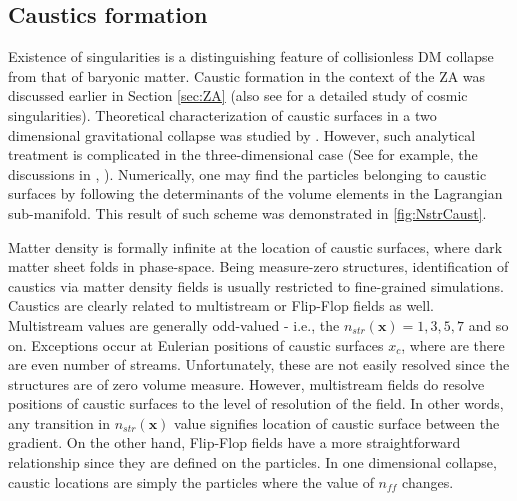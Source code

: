 



\subsection{Caustics formation}



Existence of singularities is a distinguishing feature of collisionless DM collapse from that of baryonic matter. Caustic formation in the context of the ZA \citep{Zeldovich1970} was discussed earlier in Section \ref{sec:ZA} (also see \cite{Shandarin1989} for a detailed study of cosmic singularities). Theoretical characterization of caustic surfaces in a two dimensional gravitational collapse was studied by \citep{Arnold1982}. However, such analytical treatment is complicated in the three-dimensional case (See for example, the discussions in \citealt{Hidding2014}, \citealt{Feldbrugge2018}). Numerically, one may find the particles belonging to caustic surfaces by following the determinants of the volume elements in the Lagrangian sub-manifold. This result of such scheme was demonstrated in \autoref{fig:NstrCaust}.


Matter density is formally infinite at the location of caustic surfaces, where dark matter sheet folds in phase-space. Being measure-zero structures, identification of caustics via matter density fields is usually restricted to fine-grained simulations. Caustics are clearly related to multistream or Flip-Flop fields as well. Multistream values are generally odd-valued - i.e., the $n_{str}(\mathbf{x}) = 1, 3, 5, 7$  and so on. Exceptions occur at Eulerian positions of caustic surfaces $x_c$, where are there are even number of streams. Unfortunately, these are not easily resolved since the structures are of zero volume measure. However, multistream fields do resolve positions of caustic surfaces to the level of resolution of the field. In other words, any transition in $n_{str}(\mathbf{x})$ value signifies location of caustic surface between the gradient. On the other hand, Flip-Flop fields have a more straightforward relationship since they are defined on the particles. In one dimensional collapse, caustic locations are simply the particles where the value of $n_{ff}$ changes. 

